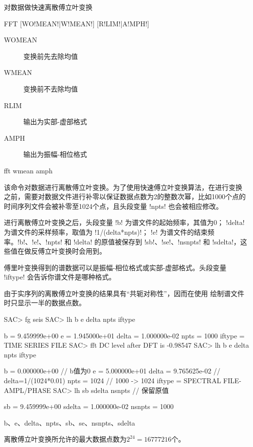 \label{cmd:fft}

对数据做快速离散傅立叶变换

\begin{SACSTX}
FFT [WO!MEAN!|W!MEAN!] [R!LIM!|A!MPH!]
\end{SACSTX}

\begin{description}
\item [WOMEAN] 变换前先去除均值
\item [WMEAN] 变换前不去除均值
\item [RLIM] 输出为实部-虚部格式
\item [AMPH] 输出为振幅-相位格式
\end{description}

\begin{SACDFT}
fft wmean amph
\end{SACDFT}

该命令对数据进行离散傅立叶变换。为了使用快速傅立叶变换算法，在进行变换
之前，需要对数据文件进行补零以保证数据点数为2的整数次幂，比如1000个点的
时间序列文件会被补零至1024个点，且头段变量 !npts! 也会被相应修改。

进行离散傅立叶变换之后，头段变量 !b! 为谱文件的起始频率，其值为0；
!delta! 为谱文件的采样频率，取值为 !1/(delta*npts)!；
!e! 为谱文件的结束频率。!b!、!e!、!npts! 和
!delta! 的原值被保存到 !sb!、!se!、!nsnpts!
和 !sdelta!，这些值在做反傅立叶变换时会用到。

傅里叶变换得到的谱数据可以是振幅-相位格式或实部-虚部格式。头段变量
!iftype! 会告诉你谱文件是哪种格式。

由于实序列的离散傅立叶变换的结果具有``共轭对称性''，因而在使用
 绘制谱文件时只显示一半的数据点数。

\begin{SACCode}
SAC> fg seis
SAC> lh b e delta npts iftype

          b = 9.459999e+00
          e = 1.945000e+01
      delta = 1.000000e-02
       npts = 1000
     iftype = TIME SERIES FILE
SAC> fft
 DC level after DFT is -0.98547
SAC> lh b e delta npts iftype

          b = 0.000000e+00              // b值为0
          e = 5.000000e+01
      delta = 9.765625e-02              // delta=1/(1024*0.01)
       npts = 1024                      // 1000 -> 1024
     iftype = SPECTRAL FILE-AMPL/PHASE
SAC> lh sb sdelta nsnpts                // 保留原值

         sb = 9.459999e+00
     sdelta = 1.000000e-02
     nsnpts = 1000
\end{SACCode}

b、e、delta、npts、sb、se、nsnpts、sdelta

离散傅立叶变换所允许的最大数据点数为$2^{24}=16777216$个。
